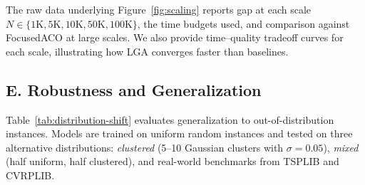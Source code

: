 \documentclass[sigconf,anonymous,review]{acmart}
\theoremstyle{definition}
\theoremstyle{plain}
\begin{document}
\begin{table}[h]
\centering
\caption{Extended profiling: wall-time breakdown (ms) per outer iteration.}
\label{tab:profiling-full}
\end{table}

The raw data underlying Figure~\ref{fig:scaling} reports gap at each scale $N \in \{1\text{K}, 5\text{K}, 10\text{K}, 50\text{K}, 100\text{K}\}$, the time budgets used, and comparison against FocusedACO at large scales.
We also provide time--quality tradeoff curves for each scale, illustrating how LGA converges faster than baselines.

\subsection{E. Robustness and Generalization}

Table~\ref{tab:distribution-shift} evaluates generalization to out-of-distribution instances.
Models are trained on uniform random instances and tested on three alternative distributions: \emph{clustered} (5--10 Gaussian clusters with $\sigma=0.05$), \emph{mixed} (half uniform, half clustered), and real-world benchmarks from TSPLIB and CVRPLIB.

\begin{table}[h]
\centering
\caption{E1: Generalization to out-of-distribution instances (trained on uniform).}
\label{tab:distribution-shift}
\end{table}
\end{document}
